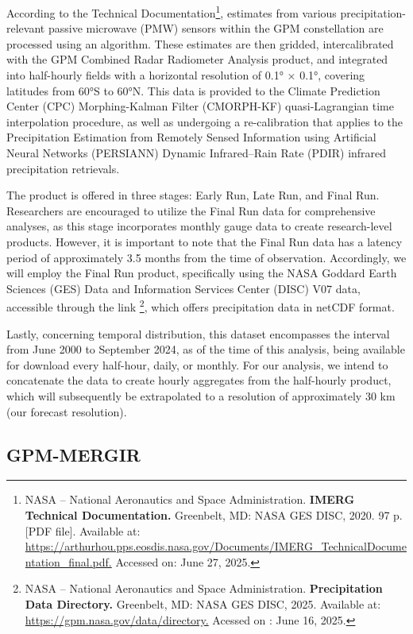 According to the Technical Documentation\footnote{NASA – National Aeronautics and Space Administration. \textbf{IMERG Technical Documentation.} Greenbelt, MD: NASA GES DISC, 2020. 97 p. [PDF file]. Available at: \url{https://arthurhou.pps.eosdis.nasa.gov/Documents/IMERG_TechnicalDocumentation_final.pdf.} Accessed on: June 27, 2025.}, estimates from various precipitation-relevant passive microwave (PMW) sensors within the GPM constellation are processed using an algorithm. These estimates are then gridded, intercalibrated with the GPM Combined Radar Radiometer Analysis product, and integrated into half-hourly fields with a horizontal resolution of 0.1° × 0.1°, covering latitudes from 60°S to 60°N. This data is provided to the Climate Prediction Center (CPC) Morphing-Kalman Filter (CMORPH-KF) quasi-Lagrangian time interpolation procedure, as well as undergoing a re-calibration that applies to the Precipitation Estimation from Remotely Sensed Information using Artificial Neural Networks (PERSIANN) Dynamic Infrared–Rain Rate (PDIR) infrared precipitation retrievals.

The product is offered in three stages: Early Run, Late Run, and Final Run. Researchers are encouraged to utilize the Final Run data for comprehensive analyses, as this stage incorporates monthly gauge data to create research-level products. However, it is important to note that the Final Run data has a latency period of approximately 3.5 months from the time of observation. Accordingly, we will employ the Final Run product, specifically using the NASA Goddard Earth Sciences (GES) Data and Information Services Center (DISC) V07 data, accessible through the link \footnote{NASA – National Aeronautics and Space Administration. \textbf{Precipitation Data Directory.} Greenbelt, MD: NASA GES DISC, 2025. Available at: \url{https://gpm.nasa.gov/data/directory.} Acessed on : June 16, 2025.}, which offers precipitation data in netCDF format.

Lastly, concerning temporal distribution, this dataset encompasses the interval from June 2000 to September 2024, as of the time of this analysis, being available for download every half-hour, daily, or monthly. For our analysis, we intend to concatenate the data to create hourly aggregates from the half-hourly product, which will subsequently be extrapolated to a resolution of approximately 30 km (our forecast resolution).

\subsection{GPM-MERGIR}

